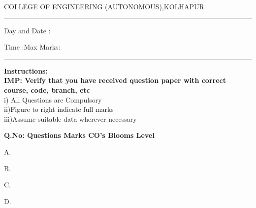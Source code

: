 \documentclass[12pt]{article}
\begin{document}
	
\par
COLLEGE OF ENGINEERING (AUTONOMOUS),KOLHAPUR
\par\noindent\rule{\textwidth}{0.4pt}

\par
{}\par
\begin{flushleft}
Day and Date :
\end{flushleft}

\begin{flushleft}
Time :\hspace{3cm}Max Marks:{}\\
\end{flushleft}
\noindent\rule{\textwidth}{0.1pt}
\begin{flushleft}
{\bf Instructions:}\\
{\hspace{0.5cm} \bf IMP: Verify that you have received question paper with correct course, code, branch, etc}\\
\hspace{1cm}i) All Questions are Compulsory\\
\hspace{1cm}ii)Figure to right indicate full marks\\
\hspace{1cm}iii)Assume suitable data wherever necessary\\
\end{flushleft} 

\begin{flushleft}
{\bf Q.No: \hspace{2.5cm} \bf Questions \hspace{0.25cm} \bf Marks \hspace{0.25cm} \bf CO's\hspace{0.25cm} \bf Blooms Level}	
\end{flushleft}

\begin{flushleft}
	\hspace{1cm}\par
	\begin{flushleft}
		\hspace{1cm}A.\par
		\hspace{1cm}B.\par
		\hspace{1cm}C.\par
		\hspace{1cm}D.\par
		
	\end{flushleft}
\end{flushleft}
\end{document}
